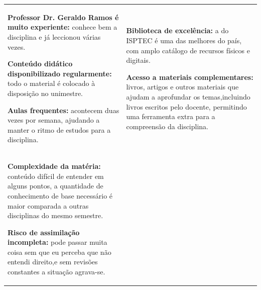 \documentclass[a4paper,11pt]{article}
\begin{document}
\noindent
\begin{tabularx}{\textwidth}{@{} X @{\hspace{8pt}} X @{}}
  \begin{tcolorbox}[swotbox,
    title={FORÇAS (Strengths)},
    colback=forcasLight, colframe=forcas, colbacktitle=forcas,
    height=\rowheight]
    \begin{swotlist}
      \item \textbf{Professor Dr. Geraldo Ramos é muito experiente:} conhece bem a disciplina e já leccionou várias vezes.
      \item \textbf{Conteúdo didático disponibilizado regularmente:} todo o material é colocado à disposição no unimestre.
      \item \textbf{Aulas frequentes:} acontecem duas vezes por semana, ajudando a manter o ritmo de estudos para a disciplina.
    \end{swotlist}
  \end{tcolorbox}
  &
  \begin{tcolorbox}[swotbox,
    title={OPORTUNIDADES (Opportunities)},
    colback=oporLight, colframe=opor, colbacktitle=opor,
    height=\rowheight]
    \begin{swotlist}
      \item \textbf{Biblioteca de excelência:} a do ISPTEC é uma das melhores do país, com amplo catálogo de recursos físicos e digitais.
      \item \textbf{Acesso a materiais complementares:} livros, artigos e outros materiais que ajudam a aprofundar os temas,incluindo livros escritos pelo docente, permitindo uma ferramenta extra para a compreensão da disciplina.
    \end{swotlist}
  \end{tcolorbox} \\[8pt]
  \begin{tcolorbox}[swotbox,
    title={FRAQUEZAS (Weaknesses)},
    colback=fraqLight, colframe=fraq, colbacktitle=fraq,
    height=\rowheight]
    \begin{swotlist}
      \item \textbf{Complexidade da matéria:} conteúdo difícil de entender em alguns pontos, a quantidade de conhecimento de base necessário é maior comparada a outras disciplinas do mesmo semestre.
      \item \textbf{Risco de assimilação incompleta:} pode passar muita coisa sem que eu perceba que não entendi direito,e sem revisões constantes a situação agrava-se.

\end{swotlist}
\end{tcolorbox}
\end{tabularx}
\end{document}
